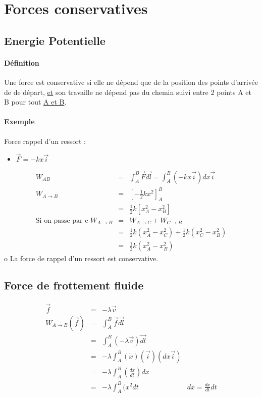 \section{Forces conservatives}
\subsection{Energie Potentielle}

\paragraph{Définition} Une force est conservative si elle ne dépend que de la position des points d'arrivée de de départ, \ul{et} son travaille ne dépend pas du chemin suivi entre 2 points A et B pour tout \ul{A et B}.

\paragraph{Exemple}

Force rappel d'un ressort : 

\begin{itemize}
	\item $\vec{F} = -kx\vec{i}$
\end{itemize}
\[\begin{array}{rcl}
		W_{AB} &=& \int_A^B \vec{F}\vec{dl} = \int_A^B (-kx\vec{i}) dx\vec{i} \\
		W_{A \to B} &=& [-\frac{1}{2}kx^2]^B_A \\
			   &=& \frac{1}{2}k[x^2_A - x^2_B] \\
\text{Si on passe par c } W_{A\to B} &=& W_{A \to C} + W_{C \to B} \\
			   &=& \frac{1}{2}k(x^2_A - x^2_C) + \frac{1}{2}k(x^2_C-x^2_B) \\
			   &=& \frac{1}{2}k(x^2_A - x^2_B)
\end{array}\]o
La force de rappel d'un ressort est conservative.

\subsection{Force de frottement fluide}

\[\begin{array}{rclr}
		\vec{f} &=& -\lambda \vec{v} \\
		W_{A \to B}(\vec{f}) &=& \int_A^B \vec{f}\vec{dl} \\
			  &=& \int_A^B(-\lambda \vec{v}) \vec{dl} \\
			   &=& -\lambda \int_A^B(\dot{x})(\vec{i})(dx\vec{i})  \\
			&=& -\lambda \int_A^B (\frac{dx}{dt}) dx  \\
			&=& -\lambda \int_A^B(\ddot{x^2} dt & dx = \frac{dx}{dt}dt
\end{array}\]


